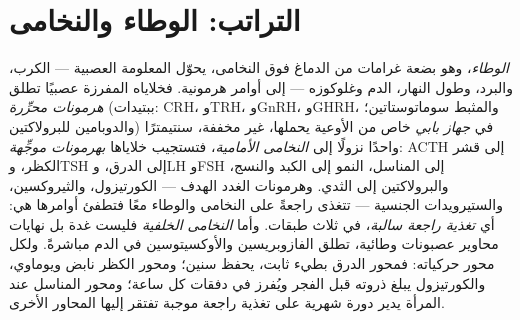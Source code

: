 \section{التراتب: الوطاء والنخامى}

\begin{definition}[المحاور]\label{def:b3:endocrinology:axes}
\emph{الوطاء}، وهو بضعة غرامات من الدماغ فوق النخامى، يحوّل
المعلومة العصبية --- الكرب، والبرد، وطول النهار، 
الدم وغلوكوزه --- إلى أوامر هرمونية. فخلاياه المفرزة عصبيًا
تطلق \emph{هرمونات محرِّرة} (ببتيدات: CRH، وTRH، وGnRH،
وGHRH، والمثبط سوماتوستاتين؛ والدوبامين للبرولاكتين) في
\emph{جهاز بابي} خاص من الأوعية يحملها، غير مخففة، سنتيمترًا
واحدًا نزولًا إلى \emph{النخامى الأمامية}، فتستجيب خلاياها
\emph{بهرمونات موجِّهة}: ACTH إلى قشر الكظر، وTSH إلى الدرق،
وLH وFSH إلى المناسل،  النمو إلى الكبد والنسج،
والبرولاكتين إلى الثدي. وهرمونات الغدد الهدف --- الكورتيزول،
والثيروكسين، والستيرويدات الجنسية --- تتغذى راجعةً على
النخامى والوطاء معًا فتطفئ أوامرها هي: أي \emph{تغذية راجعة
سالبة}، في ثلاث طبقات. وأما \emph{النخامى الخلفية} فليست
غدة بل نهايات محاوير عصبونات وطائية، تطلق الفازوبريسين
والأوكسيتوسين في الدم مباشرةً. ولكل محور حركياته: فمحور
الدرق بطيء ثابت، يحفظ  سنين؛ ومحور الكظر نابض
ويوماوي، والكورتيزول يبلغ ذروته قبل الفجر ويُفرز في دفقات
كل ساعة؛ ومحور المناسل عند المرأة يدير دورة شهرية على تغذية
راجعة موجبة تفتقر إليها المحاور الأخرى.
\end{definition}

